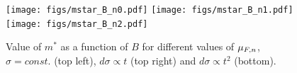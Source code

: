 \begin{figure}
    \centering
    \texttt{[image: figs/mstar\_B\_n0.pdf]}
    \texttt{[image: figs/mstar\_B\_n1.pdf]}    
    \texttt{[image: figs/mstar\_B\_n2.pdf]}      
    \caption{Value of $m^*$ as a function of $B$ for different values of $\mu_{F,n}$, $\sigma=const.$ (top left), $d\sigma\propto t$ (top right) and $d\sigma\propto t^2$ (bottom).}
    \label{fig:mstarbmu}
\end{figure}



